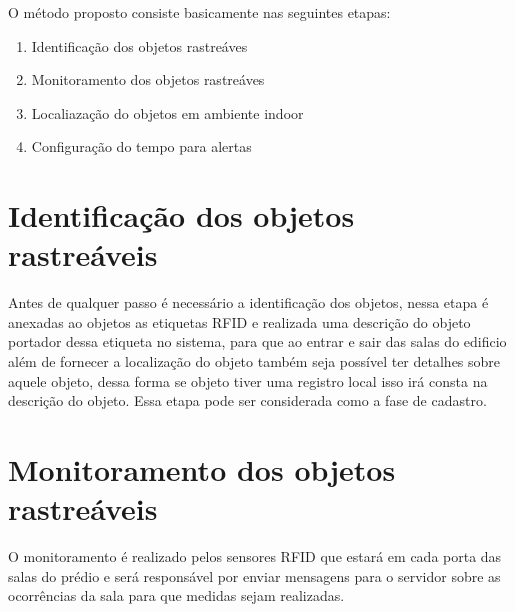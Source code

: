 \par
O método proposto consiste basicamente nas seguintes etapas:
\begin{enumerate}
    \item Identificação dos objetos rastreáves
    \item Monitoramento dos objetos rastreáves
    \item Localiazação do objetos em ambiente indoor
    \item Configuração do tempo para alertas
\end{enumerate}
\section{Identificação dos objetos rastreáveis}
Antes de qualquer passo é necessário a identificação dos objetos, nessa etapa é anexadas ao objetos as etiquetas RFID e realizada uma descrição do objeto portador dessa etiqueta no sistema, para que ao entrar e sair das salas do edificio além de fornecer a localização do objeto também seja possível ter detalhes sobre aquele objeto, dessa forma se objeto tiver uma registro local isso irá consta na descrição do objeto. Essa etapa pode ser considerada como a fase de cadastro.

\section{Monitoramento dos objetos rastreáveis}
O monitoramento é realizado pelos sensores RFID que estará em cada porta das salas do prédio e será responsável por enviar mensagens para o servidor sobre as ocorrências da sala para que medidas sejam realizadas.
